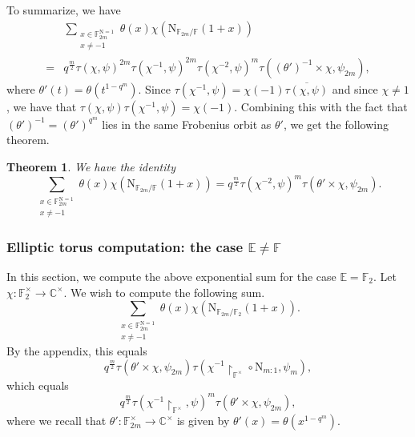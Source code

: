 \documentclass[12pt, reqno]{amsart}
\newtheorem{theorem}{Theorem}[section]
\theoremstyle{definition}
\theoremstyle{definition}
\theoremstyle{definition}
\newcommand{\cComplex}{\mathbb{C}}
\newcommand{\multiplicativegroup}[1]{#1^{\times}}
\newcommand{\conjugate}[1]{\overline{#1}}
\newcommand{\fieldCharacter}{\psi}
\newcommand{\FieldNorm}[2]{\mathrm{N}_{#1:#2}}
\newcommand{\aFieldNorm}{\mathrm{N}}
\newcommand{\finiteField}{\mathbb{F}}
\newcommand{\quadraticExtension}{\mathbb{E}}
\newcommand{\finiteFieldExtension}[1]{\finiteField_{#1}}
\newcommand{\NormOneGroup}[1]{\finiteFieldExtension{#1}^{\aFieldNorm = 1}}
\newcommand{\GaussSumSingleCharacter}[2]{\tau\left(#1, #2\right)}
\newcommand{\GaussSumCharacter}[3]{\tau\left(#1 \times #2, #3\right)}
\begin{document}
To summarize, we have
\begin{align*}
	& \sum_{\substack{x \in \NormOneGroup{2m}\\
			x \ne -1}} \theta \left(x\right) \chi\left(\aFieldNorm_{\finiteFieldExtension{2m} \slash \finiteField}\left(1 + x\right)\right) \\
		=& q^{\frac{m}{2}} \GaussSumSingleCharacter{\chi}{\fieldCharacter}^{2m} \GaussSumSingleCharacter{\chi^{-1}}{\fieldCharacter}^{2m} \GaussSumSingleCharacter{\chi^{-2}}{\fieldCharacter}^m \GaussSumCharacter{\left(\theta'\right)^{-1}}{\chi}{\fieldCharacter_{2m}},
\end{align*}
where $\theta'\left(t\right) = \theta\left(t^{1-q^m}\right)$.
Since $\tau\left(\chi^{-1}, \fieldCharacter\right) = \chi\left(-1\right) \conjugate{\tau\left(\chi, \fieldCharacter\right)}$ and since $\chi \ne 1$, we have that $\tau\left(\chi, \fieldCharacter\right) \tau\left(\chi^{-1}, \fieldCharacter\right) = \chi\left(-1\right)$. Combining this with the fact that $\left(\theta'\right)^{-1} = \left(\theta'\right)^{q^m}$ lies in the same Frobenius orbit as $\theta'$, we get the following theorem.
\begin{theorem}\label{thm:computation-norm-one-case}
	We have the identity $$\sum_{\substack{x \in \NormOneGroup{2m}\\
			x \ne -1}} \theta \left(x\right) \chi\left(\aFieldNorm_{\finiteFieldExtension{2m} \slash \finiteField}\left(1 + x\right)\right) = q^{\frac{m}{2}} \GaussSumSingleCharacter{\chi^{-2}}{\fieldCharacter}^m \GaussSumCharacter{\theta'}{\chi}{\fieldCharacter_{2m}}.$$
\end{theorem}

\subsubsection{Elliptic torus computation: the case $\quadraticExtension \ne \finiteField$}
In this section, we compute the above exponential sum for the case $\quadraticExtension = \finiteFieldExtension{2}$. Let $\chi \colon \multiplicativegroup{\finiteFieldExtension{2}} \to \multiplicativegroup{\cComplex}$. We wish to compute the following sum.
$$\sum_{\substack{x \in \NormOneGroup{2m}\\
		x \ne -1}} \theta \left(x\right) \chi\left(\aFieldNorm_{\finiteFieldExtension{2m} \slash \finiteFieldExtension{2}}\left(1 + x\right)\right).$$
By the appendix, this equals
$$q^{\frac{m}{2}} \GaussSumCharacter{\theta'}{\chi}{\fieldCharacter_{2m}} \tau\left(\chi^{-1} \restriction_{\multiplicativegroup{\finiteField}} \circ \FieldNorm{m}{1}, \fieldCharacter_m\right),$$
which equals
$$q^{\frac{m}{2}} \tau\left(\chi^{-1} \restriction_{\multiplicativegroup{\finiteField}}, \fieldCharacter\right)^m \GaussSumCharacter{\theta'}{\chi}{\fieldCharacter_{2m}},$$
where we recall that $\theta' \colon \multiplicativegroup{\finiteFieldExtension{2m}} \to \multiplicativegroup{\cComplex}$ is given by $\theta'\left(x\right) = \theta\left(x^{1-q^m}\right)$.
\end{document}
